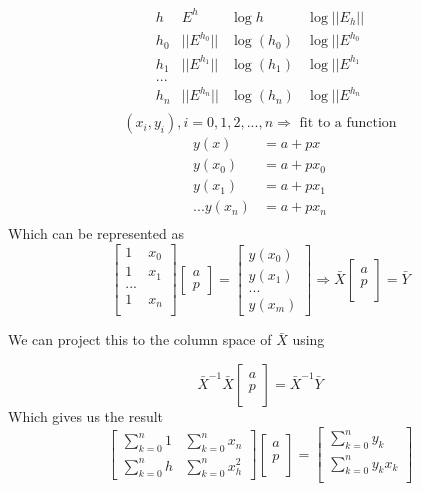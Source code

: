 \documentclass[10pt]{article}
\newcommand{\1}{\mathbb{1}}
\begin{document}
        \[\begin{matrix}
        h & E^h & \log h &\log||E_h||\\
        \hline
        h_0 & ||E^{h_0}|| & \log(h_0) & \log||E^{h_0}\\
        h_1 & ||E^{h_1}|| & \log(h_1) & \log||E^{h_1}\\
        ...\\
        h_n & ||E^{h_n}|| & \log(h_n) & \log||E^{h_n}\\
    \end{matrix}\]
    \[(x_i, y_i), i = 0,1,2,...,n \Rightarrow \text{ fit to a function}\]
    \begin{align*}
        y(x) &= a + px\\
        y(x_0) &= a + px_0\\
        y(x_1) &= a + px_1\\
        ...
        y(x_n) &= a + px_n\\
    \end{align*}
    Which can be represented as
    \[\begin{bmatrix}
        1 & x_0\\
        1 & x_1\\
        ...\\
        1 & x_n\\
    \end{bmatrix}
\begin{bmatrix}
    a\\
    p
    \end{bmatrix}
    =
\begin{bmatrix}
    y(x_0)\\
    y(x_1)\\
    ...\\
    y(x_m)
    \end{bmatrix}
    \Rightarrow
    \bar{X} \begin{bmatrix} a\\ p\\ \end{bmatrix} = \bar{Y}
        \]

We can project this to the column space of $\bar{X}$ using

\[\bar{X}^{-1} \bar{X} \begin{bmatrix} a\\ p\\ \end{bmatrix} = \bar{X}^{-1} \bar{Y}\]
Which gives us the result
\[\begin{bmatrix}
\sum_{k=0}^n 1 & \sum_{k=0}^n x_n\\
\sum_{k=0}^n h & \sum_{k=0}^n x_h^2
\end{bmatrix}
\begin{bmatrix}
a\\
p\\
\end{bmatrix}
=
\begin{bmatrix}
\sum_{k=0}^n y_k\\
\sum_{k=0}^n y_kx_k\\
\end{bmatrix}
\]
\end{document}
